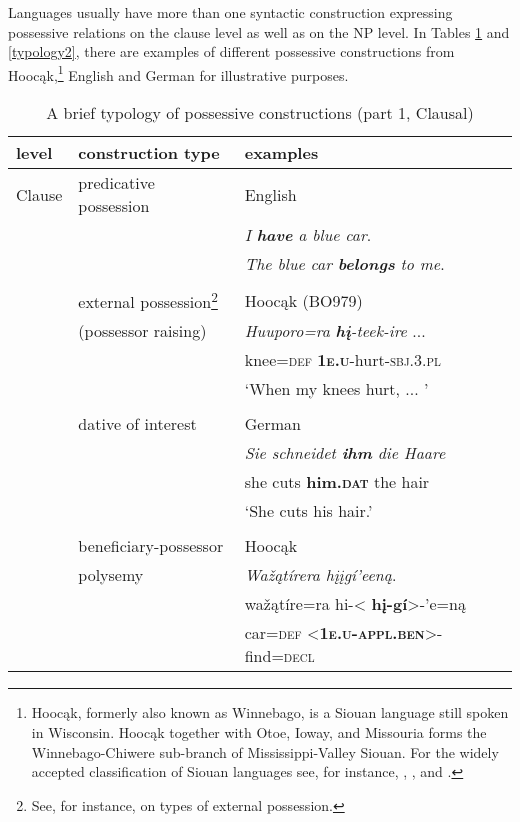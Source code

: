 \documentclass[output=paper]{LSP/langsci}
\begin{document}
Languages usually have more than one syntactic construction expressing possessive relations on the clause level as well as on the NP level. In Tables \ref{typology1} and \ref{typology2}, there are examples of different possessive constructions from Hooc\k{a}k,\footnote{Hooc\k{a}k, formerly also known as Winnebago, is a Siouan language still spoken in Wisconsin. Hooc\k{a}k together with Otoe, Ioway, and Missouria forms the Winnebago-Chiwere sub-branch of Mississippi-Valley Siouan. For the widely accepted classification of Siouan languages see, for instance, \citet{Rood1979}, \citet[501]{Mithun1999}, and  \citet{ParksRankin2001}.} English and German for illustrative purposes.

\begin{table}
\caption{A brief typology of possessive constructions (part 1, Clausal)} \label{typology1}
\begin{tabular}{l l l }
\lsptoprule
level & construction type & examples \\
\midrule
Clause& predicative possession 	& English \\ 
& & \textit{I \textbf{have} a blue car}. \\
 & & \textit{The blue car \textbf{belongs} to me}. \\
 & \\
& external possession\footnote{See, for instance,  \citet{PayneBarshi1999} on types of external possession.} & Hooc\k{a}k (BO979)\\     
& (possessor raising) & \textit{Huuporo=ra \textbf{h\k{i}}-teek-ire} ... \\ 
& & knee=\textsc{def}   \textbf{\textsc{1e.u}}-hurt-\textsc{sbj.3.pl} \\
& & `When my knees hurt, ... ' \\
& \\
& dative of interest & German \\
& & \textit{Sie schneidet \textbf{ihm}           die Haare} \\
& & she cuts         \textbf{him.\textsc{dat}} the hair \\
& & `She cuts his hair.' \\
& \\
&beneficiary-possessor & Hooc\k{a}k \citep[28]{Helmbrecht2003} \\
& polysemy  & \textit{Waž\k{a}tírera hįįgí'een\k{a}}.\\
& & waž\k{a}tíre=ra    hi-< \textbf{hį-gí}>-'e=n\k{a} \\
& & car=\textsc{def}  <\textbf{\textsc{1e.u-appl.ben}}>-find=\textsc{decl} \\

\end{tabular}
\end{table}
\end{document}
